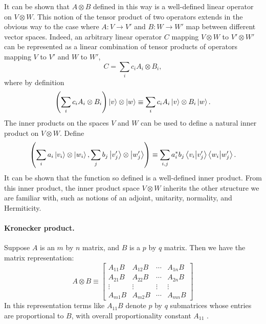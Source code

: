 \documentclass{article}
\begin{document}
It can be shown that $A \otimes B$ defined in this way is a well-defined linear
operator on $V \otimes W$. This notion of the tensor product of two operators
extends in the obvious way to the case where $A: V \rightarrow V'$ and $B: W
\rightarrow W'$ map between different vector spaces. Indeed, an arbitrary
linear operator $C$ mapping $V \otimes W$ to $V' \otimes W'$ can be represented
as a linear combination of tensor products of operators mapping $V$ to $V'$ and
$W$ to $W'$, \begin{equation*}
  C = \sum_i c_iA_i \otimes B_i,
\end{equation*}
where by definition \begin{equation*}
  \left(\sum_i c_iA_i \otimes B_i\right) \ket{v} \otimes \ket{w}
    \equiv \sum_i c_iA_i\ket{v} \otimes B_i\ket{w}.
\end{equation*}
The inner products on the spaces $V$ and $W$ can be used to define a natural
inner product on $V \otimes W$. Define \begin{equation*}
  \left(\sum_i a_i\ket{v_i} \otimes \ket{w_i}, \sum_j b_j\ket{v'_j} \otimes
    \ket{w'_j}\right) \equiv \sum_{i,j} a_i^*b_j \braket{v_i}{v'_j}
    \braket{w_i}{w'_j}.
\end{equation*}
It can be shown that the function so defined is a well-defined inner product.
From this inner product, the inner product space $V \otimes W$ inherits the
other structure we are familiar with, such as notions of an adjoint, unitarity,
normality, and Hermiticity.

\paragraph{Kronecker product.} Suppose $A$ is an $m$ by $n$ matrix, and $B$ is
a $p$ by $q$ matrix. Then we have the matrix representation: \begin{equation}
  A \otimes B \equiv \begin{bmatrix}
    A_{11}B & A_{12}B & \cdots & A_{1n}B \\
    A_{21}B & A_{22}B & \cdots & A_{2n}B \\
    \vdots & \vdots & \vdots & \vdots \\
    A_{m1}B & A_{m2}B & \cdots & A_{mn}B
  \end{bmatrix} \label{eq:kro-prod}
\end{equation}
In this representation terms like $A_{11}B$ denote $p$ by $q$ submatrices whose
entries are proportional to $B$, with overall proportionality constant $A_{11}$
.
\end{document}
